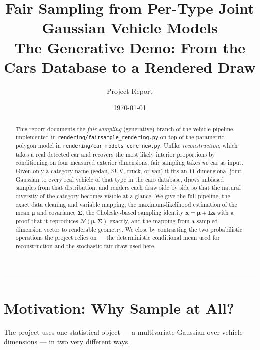 \documentclass[11pt]{article}
\title{\textbf{Fair Sampling from Per-Type Joint Gaussian Vehicle Models}\\[4pt]
\large The Generative Demo: From the Cars Database to a Rendered Draw}
\author{Project Report}
\date{\today}
\newcommand{\Norm}{\mathcal{N}}
\newcommand{\bmu}{\boldsymbol{\mu}}
\newcommand{\bSigma}{\boldsymbol{\Sigma}}
\newcommand{\bx}{\mathbf{x}}
\newcommand{\bz}{\mathbf{z}}
\newcommand{\Lmat}{\mathbf{L}}
\theoremstyle{definition}
\begin{document}
\maketitle

\begin{abstract}
\noindent This report documents the \emph{fair-sampling} (generative) branch of the vehicle pipeline, implemented in \texttt{rendering/fairsample\_rendering.py} on top of the parametric polygon model in \texttt{rendering/car\_models\_core\_new.py}. Unlike \emph{reconstruction}, which takes a real detected car and recovers the most likely interior proportions by conditioning on four measured exterior dimensions, fair sampling takes \emph{no} car as input. Given only a category name (sedan, SUV, truck, or van) it fits an $11$-dimensional joint Gaussian to every real vehicle of that type in the cars database, draws unbiased samples from that distribution, and renders each draw side by side so that the natural diversity of the category becomes visible at a glance. We give the full pipeline, the exact data cleaning and variable mapping, the maximum-likelihood estimation of the mean $\bmu$ and covariance $\bSigma$, the Cholesky-based sampling identity $\bx=\bmu+\Lmat\bz$ with a proof that it reproduces $\Norm(\bmu,\bSigma)$ exactly, and the mapping from a sampled dimension vector to renderable geometry. We close by contrasting the two probabilistic operations the project relies on --- the deterministic conditional mean used for reconstruction and the stochastic fair draw used here.
\end{abstract}

\tableofcontents
\vspace{1em}
\hrule
\vspace{1em}

\section{Motivation: Why Sample at All?}

The project uses one statistical object --- a multivariate Gaussian over vehicle dimensions --- in two very different ways.
\end{document}
